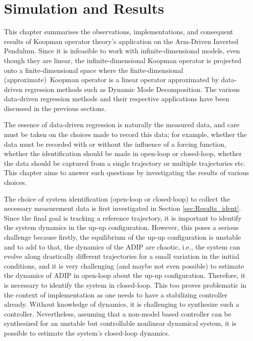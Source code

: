 \section{Simulation and Results}
\label{Chapter:Sim}

This chapter summarises the observations, implementations, and consequent results of Koopman operator theory's application on the Arm-Driven Inverted Pendulum. Since it is infeasible to work with infinite-dimensional models, even though they are linear, the infinite-dimensional Koopman operator is projected onto a finite-dimensional space where the finite-dimensional (approximate)~Koopman operator is a linear operator approximated by data-driven regression methods such as Dynamic Mode Decomposition. The various data-driven regression methods and their respective applications have been discussed in the previous sections.\par
The essence of data-driven regression is naturally the measured data, and care must be taken on the choices made to record this data; for example, whether the data must be recorded with or without the influence of a forcing function, whether the identification should be made in open-loop or closed-loop, whether the data should be captured from a single trajectory or multiple trajectories etc. This chapter aims to answer such questions by investigating the results of various choices.\par
The choice of system identification (open-loop or closed-loop) to collect the necessary measurement data is first investigated in Section \ref{sec:Results_ident}. Since the final goal is tracking a reference trajectory, it is important to identify the system dynamics in the up-up configuration. However, this poses a serious challenge because firstly, the equilibrium of the up-up configuration is unstable and to add to that, the dynamics of the ADIP are chaotic, i.e., the system can evolve along drastically different trajectories for a small variation in the initial conditions, and it is very challenging (and maybe not even possible) to estimate the dynamics of ADIP in open-loop about the up-up configuration. Therefore, it is necessary to identify the system in closed-loop. This too proves problematic in the context of implementation as one needs to have a stabilizing controller already. Without knowledge of dynamics, it is challenging to synthesize such a controller. Nevertheless, assuming that a non-model based controller can be synthesized for an unstable but controllable nonlinear dynamical system, it is possible to estimate the system's closed-loop dynamics. \par 
